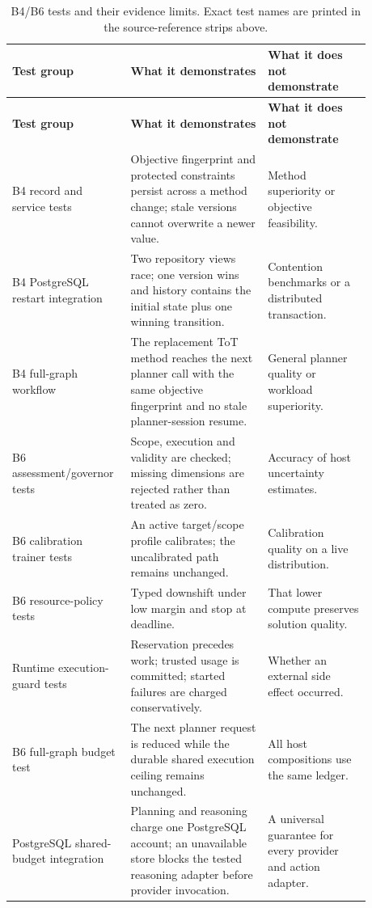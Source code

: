 \small\begin{longtable}{@{}>{\raggedright\arraybackslash}p{0.25\linewidth} >{\raggedright\arraybackslash}p{0.36\linewidth} >{\raggedright\arraybackslash}p{0.27\linewidth}@{}}
\caption{B4/B6 tests and their evidence limits. Exact test names are printed in the source-reference strips above.}\label{tab:ch23-test-map}\\
\toprule
\textbf{Test group} & \textbf{What it demonstrates} & \textbf{What it does not demonstrate} \\
\midrule
\endfirsthead
\toprule
\textbf{Test group} & \textbf{What it demonstrates} & \textbf{What it does not demonstrate} \\
\midrule
\endhead
B4 record and service tests & Objective fingerprint and protected constraints persist across a method change; stale versions cannot overwrite a newer value. & Method superiority or objective feasibility. \\
B4 PostgreSQL restart integration & Two repository views race; one version wins and history contains the initial state plus one winning transition. & Contention benchmarks or a distributed transaction. \\
B4 full-graph workflow & The replacement ToT method reaches the next planner call with the same objective fingerprint and no stale planner-session resume. & General planner quality or workload superiority. \\
B6 assessment/governor tests & Scope, execution and validity are checked; missing dimensions are rejected rather than treated as zero. & Accuracy of host uncertainty estimates. \\
B6 calibration trainer tests & An active target/scope profile calibrates; the uncalibrated path remains unchanged. & Calibration quality on a live distribution. \\
B6 resource-policy tests & Typed downshift under low margin and stop at deadline. & That lower compute preserves solution quality. \\
Runtime execution-guard tests & Reservation precedes work; trusted usage is committed; started failures are charged conservatively. & Whether an external side effect occurred. \\
B6 full-graph budget test & The next planner request is reduced while the durable shared execution ceiling remains unchanged. & All host compositions use the same ledger. \\
PostgreSQL shared-budget integration & Planning and reasoning charge one PostgreSQL account; an unavailable store blocks the tested reasoning adapter before provider invocation. & A universal guarantee for every provider and action adapter. \\
\bottomrule
\end{longtable}
\normalsize

